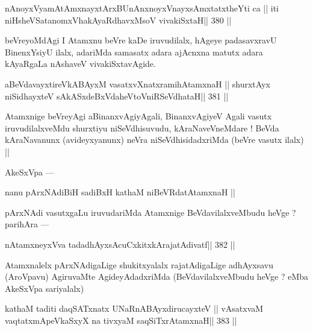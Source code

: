 \begin{shl}
nAnoyxV\s yamAtAmx\s nayxtArxBUnAnxnoyxV\s nayxsAmxtatxtheYti ca ||
iti niHsheVSatanomxVhakAyaRdhavxMsoV vivakiSxtaH\hfill || 380 ||
\end{shl}

\begin{artha}
beVreyoMdAgi I Atamxnu beVre kaDe iruvudilalx, hAgeye padasavxravU BinenxYsiyU ilalx, adariMda samasatx adara ajAcnxna matutx adara kAyaRgaLa nAshaveV vivakiSxtavAgide.
\end{artha}

\begin{shl}
aBeVdavayxtireVkABAyxM vasatxvXnatxramihA\s\s tamxnaH ||
shurxtAyx niSidhayxteV sAkASxdeBxVdaheVtoVniRSeVdhataH\hfill || 381 ||
\end{shl}

\begin{artha}
Atamxnige beVreyAgi aBinanxvAgiyAgali, BinanxvAgiyeV Agali vasutx iruvudilalxveMdu shurxtiyu niSeVdhisuvudu, kAraNaveVneMdare ! BeVda kAraNavanunx (avideyxyanunx) neVra niSeVdhisidadxriMda (beVre vasutx ilalx) ||
\end{artha}

\begin{artha}
AkeSxVpa --- 
\end{artha}

\begin{shl}
nanu pArxNAdiBiH sadiBxH kathaM niBeVRdatA\s\s tamxnaH ||
\end{shl}

\begin{artha}
pArxNAdi vasutxgaLu iruvudariMda Atamxnige BeVdavilalxveMbudu heVge ? parihAra ---
\end{artha}

\begin{shl}
nA\s\s tamxneyxVva tadadhAyxsAcuCxkitxkArajatAdivatf\hfill || 382 ||
\end{shl}

\begin{artha}
Atamxnalelx pArxNAdigaLige shukitxyalalx rajatAdigaLige adhAyxsavu (AroVpavu) AgiruvaMte AgideyAdadxriMda (BeVdavilalxveMbudu heVge ? eMba AkeSxVpa sariyalalx)
\end{artha}

\begin{shl}
kathaM taditi daqSATxnatx UNaRnABAyxdirucayxteV ||
vAsatxvaM vaqtatxmApeVkaSxyX na tivxyaM saqSiTxrAtamxnaH\hfill || 383 ||
\end{shl}

